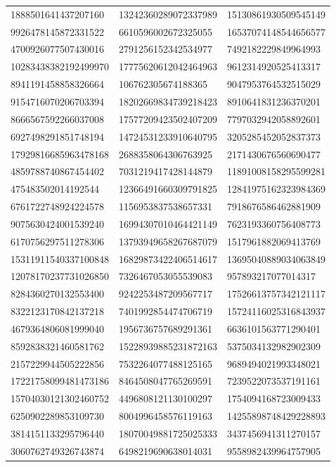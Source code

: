 \begin{longtable}{*{3}{l}}
1888501641437207160&13242360289072337989&15130861930509545149\\
9926478145872331522&6610596002672325055&16537074148544656577\\
4700926077507430016&2791256152342534977&7492182229849964993\\
10283438382192499970&17775620612042464963&9612314920525413317\\
8941191458858326664&106762305674188365&9047953764532515029\\
9154716070206703394&18202669834739218423&8910641831236370201\\
8666567592266037008&17577209423502407209&7797032942058892601\\
6927498291851748194&14724531233910640795&3205285452052837373\\
17929816685963478168&2688358064306763925&2171430676560690477\\
4859788740867454402&7031219417428144879&11891008158295599281\\
475483502014192544&12366491660309791825&12841975162323984369\\
6761722748924224578&1156953837538657331&7918676586462881909\\
9075630424001539240&16994307010464421149&7623193360756408773\\
6170756297511278306&13793949658267687079&1517961882069413769\\
15311911540337100848&16829873422406514617&13695040889034063849\\
12078170237731026850&7326467053055539083&957893217077014317\\
8284360270132553400&9242253487209567717&17526613757342121117\\
8322123170842137218&7401992854474706719&15724116025316843937\\
4679364806081999040&1956736757689291361&6636101563771290401\\
8592838321460581762&15228939885231872163&5375034132982902309\\
2157229944505222856&7532264077488125165&9689494021993348021\\
17221758099481473186&8464508047765269591&7239522073537191161\\
15704030121302460752&4496808121130100297&1754094168723009433\\
6250902289853109730&8004996458576119163&14255898748429228893\\
3814151133295796440&18070049881725025333&3437456941311270157\\
3060762749326743874&6498219690638014031&9558982439964757905\\

\end{longtable}
